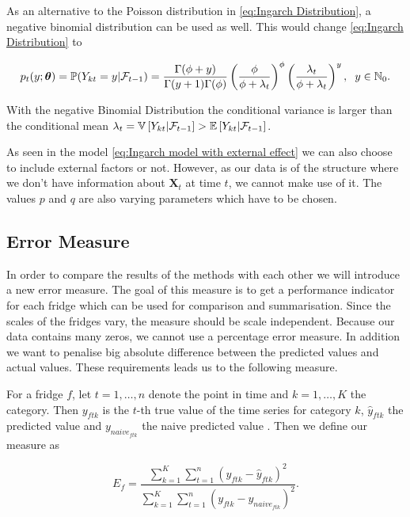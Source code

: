 As an alternative to the Poisson distribution in \ref{eq:Ingarch Distribution}, a negative binomial distribution can be used as well. This would change \ref{eq:Ingarch Distribution} to 

\begin{equation*}
p_t(y;\bm{\theta})=\mathbb{P}(Y_{kt}=y | \mathcal{F}_{t-1}) = \frac{\Gamma(\phi+y)}{\Gamma(y+1)\Gamma(\phi)}\left(\frac{\phi}{\phi+\lambda_t}\right)^\phi\left(\frac{\lambda_t}{\phi+\lambda_t}\right)^y, \hspace{0.2cm} y \in \mathbb{N}_0.
\label{eq:Ingarch negbinom Distribution}
\end{equation*}

With the negative Binomial Distribution the conditional variance is larger than the conditional mean $\lambda_t = \mathbb{V}\left[Y_{kt} | \mathcal{F}_{t-1}\right] > \mathbb{E}\left[Y_{kt} | \mathcal{F}_{t-1}\right]$.

As seen in the model \ref{eq:Ingarch model with external effect} we can also choose to include external factors or not. However, as our data is of the structure where we don't have information about $\bm{X}_t$ at time $t$, we cannot make use of it. The values $p$ and $q$ are also varying parameters which have to be chosen. 


\subsection{Error Measure}
\label{sec: Error Measure}

In order to compare the results of the methods with each other we will introduce a new error measure. The goal of this measure is to get a performance indicator for each fridge which can be used for comparison and summarisation. Since the scales of the fridges vary, the measure should be scale independent. Because our data contains many zeros, we cannot use a percentage error measure. In addition we want to penalise big absolute difference between the predicted values and actual values. These requirements leads us to the following measure.

For a fridge $f$, let $t = 1,\ldots,n$ denote the point in time and $k=1,\ldots,K$ the category. Then $y_{ftk}$ is the $t$-th true value of the time series for category $k$, $\hat{y}_{ftk}$ the predicted value and $y_{naive_{ftk}}$ the naive predicted value . Then we define our measure as

\begin{equation}
E_f=\frac{\sum_{k=1}^{K}\sum_{t=1}^n(y_{ftk}-\hat{y}_{ftk})^2}{\sum_{k=1}^{K}\sum_{t=1}^n(y_{ftk}-y_{naive_{ftk}})^2}.
\label{eq: Error Measure}
\end{equation}

